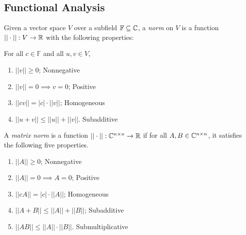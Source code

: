 \subsection{Functional Analysis}
\begin{definition}[Norm]
Given a vector space $V$ over a subfield \(\mathbb{F}\subseteq\mathbb{C}\), a \emph{norm} on $V$ is a function \(||\cdot||:V\to\mathbb{R}\) with the following properties:
\item For all \(c\in\mathbb{F}\) and all \(u,v\in V\),
\begin{enumerate}
	\item \(||v||\geq0\); \hfill Nonnegative
	\item \(||v||=0\implies v=0\); \hfill Positive
	\item \(||cv||=|c|\cdot||v||\); \hfill Homogeneous
	\item \(||u+v||\leq||u||+||v||\). \hfill Subadditive
\end{enumerate}
\end{definition}


\begin{definition}
A \emph{matrix norm} is a function \(||\cdot||:\mathbb{C}^{n\times n}\to\mathbb{R}\) if for all \(A,B\in\mathbb{C}^{n\times n}\), it satisfies the following five properties.
\begin{enumerate}
	\item \(||A||\geq0\); \hfill Nonnegative
	\item \(||A||=0\implies A=0\); \hfill Positive
	\item \(||cA||=|c|\cdot||A||\); \hfill Homogeneous
	\item \(||A+B||\leq||A||+||B||\); \hfill Subadditive
	\item \(||AB||\leq||A||\cdot||B||\). \hfill Submultiplicative
\end{enumerate}
\cite{horn}
\end{definition}



